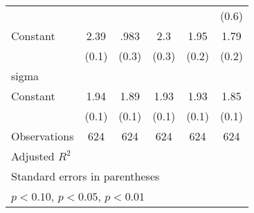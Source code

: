 \begin{table}[htbp]
\begin{tabular}{l*{5}{c}}
                &                  &                  &                  &                  &    (0.6)         \\
Constant        &     2.39\sym{***}&     .983\sym{***}&      2.3\sym{***}&     1.95\sym{***}&     1.79\sym{***}\\
                &    (0.1)         &    (0.3)         &    (0.3)         &    (0.2)         &    (0.2)         \\
\hline
sigma           &                  &                  &                  &                  &                  \\
Constant        &     1.94\sym{***}&     1.89\sym{***}&     1.93\sym{***}&     1.93\sym{***}&     1.85\sym{***}\\
                &    (0.1)         &    (0.1)         &    (0.1)         &    (0.1)         &    (0.1)         \\
\hline
Observations    &      624         &      624         &      624         &      624         &      624         \\
Adjusted \(R^{2}\)&                  &                  &                  &                  &                  \\
\hline\hline
\multicolumn{6}{l}{\footnotesize Standard errors in parentheses}\\
\multicolumn{6}{l}{\footnotesize \sym{*} \(p<0.10\), \sym{**} \(p<0.05\), \sym{***} \(p<0.01\)}\\
\end{tabular}
\end{table}
